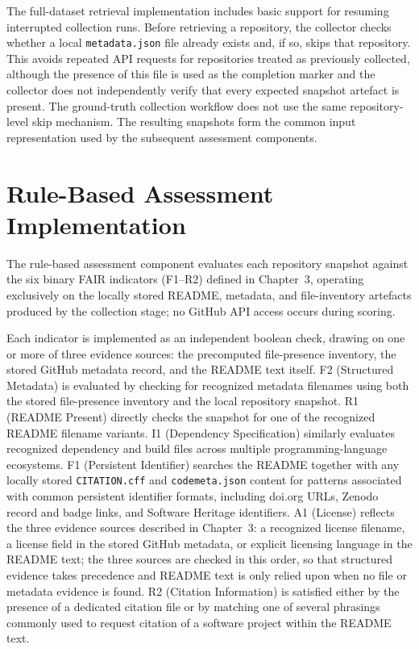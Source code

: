 The full-dataset retrieval implementation includes basic support for
resuming interrupted collection runs. Before retrieving a repository,
the collector checks whether a local \texttt{metadata.json} file
already exists and, if so, skips that repository. This avoids repeated
API requests for repositories treated as previously collected, although
the presence of this file is used as the completion marker and the
collector does not independently verify that every expected snapshot
artefact is present. The ground-truth collection workflow does not use
the same repository-level skip mechanism. The resulting snapshots form
the common input representation used by the subsequent assessment
components.

\section{Rule-Based Assessment Implementation}

The rule-based assessment component evaluates each repository
snapshot against the six binary FAIR indicators (F1--R2) defined in
Chapter~3, operating exclusively on the locally stored README,
metadata, and file-inventory artefacts produced by the collection
stage; no GitHub API access occurs during scoring.

Each indicator is implemented as an independent boolean check,
drawing on one or more of three evidence sources: the precomputed
file-presence inventory, the stored GitHub metadata record, and the
README text itself. F2 (Structured Metadata) is evaluated by
checking for recognized metadata filenames using both the stored
file-presence inventory and the local repository snapshot. R1
(README Present) directly checks the snapshot for one of the
recognized README filename variants. I1 (Dependency Specification)
similarly evaluates recognized dependency and build files across
multiple programming-language ecosystems. F1 (Persistent Identifier)
searches the README together with any locally stored
\texttt{CITATION.cff} and \texttt{codemeta.json} content for patterns
associated with common persistent identifier formats, including
doi.org URLs, Zenodo record and badge links, and Software Heritage
identifiers. A1 (License) reflects the three evidence sources
described in Chapter~3: a recognized license filename, a license
field in the stored GitHub metadata, or explicit licensing language
in the README text; the three sources are checked in this order, so
that structured evidence takes precedence and README text is only
relied upon when no file or metadata evidence is found. R2 (Citation
Information) is satisfied either by the presence of a dedicated
citation file or by matching one of several phrasings commonly used
to request citation of a software project within the README text.

